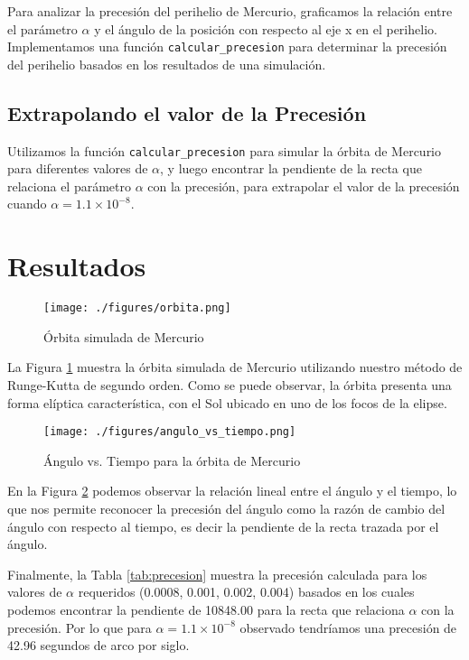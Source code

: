 \documentclass[twocolumn]{article}
\begin{document}
Para analizar la precesión del perihelio de Mercurio, graficamos la relación entre el parámetro $\alpha$ y el ángulo de la posición con respecto al eje x en el perihelio. Implementamos una función \texttt{calcular\_precesion} para determinar la precesión del perihelio basados en los resultados de una simulación.

\subsection{Extrapolando el valor de la Precesión}

Utilizamos la función \texttt{calcular\_precesion} para simular la órbita de Mercurio para diferentes valores de $\alpha$, y luego encontrar la pendiente de la recta que relaciona el parámetro $\alpha$ con la precesión, para extrapolar el valor de la precesión cuando $\alpha = 1.1 \times 10^{-8}$.

\section{Resultados}

\begin{figure}[H]
\centering
\texttt{[image: ./figures/orbita.png]}
\caption{Órbita simulada de Mercurio}
\label{fig:orbita}
\end{figure}

La Figura \ref{fig:orbita} muestra la órbita simulada de Mercurio utilizando nuestro método de Runge-Kutta de segundo orden. Como se puede observar, la órbita presenta una forma elíptica característica, con el Sol ubicado en uno de los focos de la elipse.

\begin{figure}[H]
\centering
\texttt{[image: ./figures/angulo\_vs\_tiempo.png]}
\caption{Ángulo vs. Tiempo para la órbita de Mercurio}
\label{fig:angulo_vs_tiempo}
\end{figure}

En la Figura \ref{fig:angulo_vs_tiempo} podemos observar la relación lineal entre el ángulo y el tiempo, lo que nos permite reconocer la precesión del ángulo como la razón de cambio del ángulo con respecto al tiempo, es decir la pendiente de la recta trazada por el ángulo.

Finalmente, la Tabla \ref{tab:precesion} muestra la precesión calculada para los valores de $\alpha$ requeridos (0.0008, 0.001, 0.002, 0.004) basados en los cuales podemos encontrar la pendiente de 10848.00 para la recta que relaciona $\alpha$ con la precesión. Por lo que para $\alpha = 1.1 \times 10^{-8}$ observado tendríamos una precesión de 42.96 segundos de arco por siglo.
\end{document}
